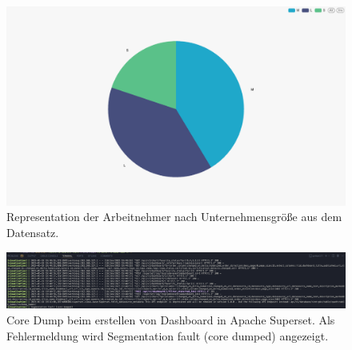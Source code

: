\label{anhang:3}
\begin{figure}[H]
  \centering
  \captionsetup{list=no} %
  \includegraphics[width=1\linewidth]{graphics/employee-per-company.jpg}
  \caption[Representation der Arbeitnehmer nach Unternehmensgröße aus dem Datensatz]{Representation der Arbeitnehmer nach Unternehmensgröße aus dem Datensatz.}
  \label{fig:chart2}
\end{figure}

\label{anhang:apachesuperset}
\begin{figure}[htb]
  \centering
  \captionsetup{list=no} %
  \includegraphics[width=1\linewidth]{graphics/core dump.png}
  \caption[Core Dump beim erstellen von Dashboard in Apache Superset]{Core Dump beim erstellen von Dashboard in Apache Superset. Als Fehlermeldung wird Segmentation fault (core dumped) angezeigt.}
  \label{fig:chart3}
\end{figure}